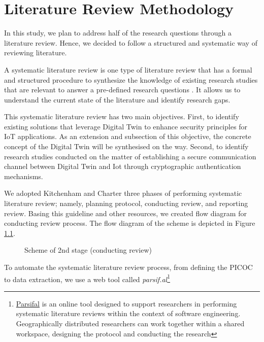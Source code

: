 \chapter{Literature Review Methodology} %

\label{Chapter2} %

In this study, we plan to address half of the research questions through a literature review. Hence, we decided to follow a structured and systematic way of reviewing literature. 

A systematic literature review is one type of literature review that has a formal and structured procedure to synthesize the knowledge of existing research studies that are relevant to answer a pre-defined research questions \cite{kofod-petersen_how_nodate, kitchenham_guidelines_2007}. It allows us to understand the current state of the literature and identify research gaps\cite{carrera-rivera_how-conduct_2022}. 

This systematic literature review has two main objectives. First, to identify existing solutions that leverage Digital Twin to enhance security principles for IoT applications. As an extension and subsection of this objective, the concrete concept of the Digital Twin will be synthesised on the way. Second, to identify research studies conducted on the matter of establishing a secure communication channel between Digital Twin and Iot through cryptographic authentication mechanisms.  

We adopted Kitchenham and Charter three phases of performing systematic literature review; namely, planning protocol, conducting review, and reporting review. Basing this guideline and other resources, we created flow diagram for conducting review process. The flow diagram of the scheme is depicted in Figure \ref{fig:slr-proc}. 

\begin{figure}[H]
    \centering
    
    \caption{Scheme of 2nd stage (conducting review) }
    \label{fig:slr-proc}
\end{figure}


To automate the systematic literature review process, from defining the PICOC to data extraction, we use a web tool called \textit{parsif.al}\footnote{\href{https://parsif.al}{Parsifal} is an online tool designed to support researchers in performing systematic literature reviews within the context of software engineering. Geographically distributed researchers can work together within a shared workspace, designing the protocol and conducting the research}

